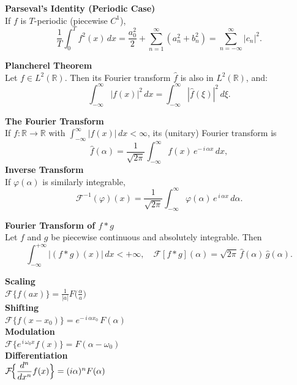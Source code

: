 \documentclass[8pt]{article}
\begin{document}
\begin{multicols}{2}
\noindent \textbf{Parseval's Identity (Periodic Case)}\\
If $f$ is $T$-periodic (piecewise $C^1$),
\[
  \frac{1}{T}\int_{0}^{T} f^{2}(x)\,dx
  = \frac{a_{0}^{2}}{2} + \sum_{n=1}^{\infty}(a_{n}^{2}+b_{n}^{2})
  = \sum_{n=-\infty}^{\infty}\!\!\bigl|c_{n}\bigr|^{2}.
\]

\noindent \textbf{Plancherel Theorem}\\
Let $f \in L^2(\mathbb{R})$. Then its Fourier transform $\hat{f}$ is also in $L^2(\mathbb{R})$, and:
\[
  \int_{-\infty}^\infty |f(x)|^2 \, dx
  = \int_{-\infty}^\infty |\hat{f}(\xi)|^2 \, d\xi.
\]

\noindent \textbf{The Fourier Transform}\\
If $f:\mathbb{R}\to\mathbb{R}$ with $\int_{-\infty}^{\infty}\!|f(x)|\,dx<\infty$, its (unitary) Fourier transform is
\[
  \widehat{f}(\alpha)=\frac{1}{\sqrt{2\pi}}
  \int_{-\infty}^{\infty} f(x)\, e^{-\,i\,\alpha x}\,dx,
\]
\noindent \textbf{Inverse Transform}\\
If $\varphi(\alpha)$ is similarly integrable,
\[
  \mathcal{F}^{-1}(\varphi)(x)= \frac{1}{\sqrt{2\pi}}
  \int_{-\infty}^{\infty}\!\varphi(\alpha)\,e^{\,i\,\alpha x}\,d\alpha.
\]

\noindent \textbf{Fourier Transform of \(f * g\)}\\
Let \(f\) and \(g\) be piecewise continuous and absolutely integrable. Then
\[
  \int_{-\infty}^{+\infty} |(f * g)(x)|\,dx < +\infty,\quad
  \mathcal{F}[f * g](\alpha)
  = \sqrt{2\pi} \,\hat{f}(\alpha)\,\hat{g}(\alpha).
\]

\setlength{\columnsep}{-35pt} %
\begin{multicols}{2}
    \small
    \textbf{Scaling} \\
    $\mathcal{F}\{f(ax)\} = \frac{1}{|a|} F\!\bigl(\tfrac{\alpha}{a}\bigr)$\\

    \textbf{Shifting} \\
    $\mathcal{F}\{f(x - x_0)\} = e^{-\,i\,\alpha x_0}\,F(\alpha)$\\

    \textbf{Modulation} \\
    $\mathcal{F}\{e^{\,i\,\omega_0 x} f(x)\} = F(\alpha - \omega_0)$\\

    \textbf{Differentiation} \\
    $\mathcal{F}\!\Bigl\{\dfrac{d^n}{dx^n}f(x)\Bigr\}
        = (i \alpha)^n F(\alpha)$\\


\end{multicols}
\end{multicols}
\end{document}
